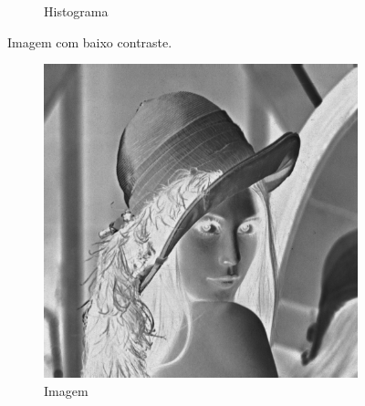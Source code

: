 \begin{figure}[!h]
\begin{subfigure}{\figw}
            \caption{\label{fig:lena_gray2:hist} Histograma}
        \end{subfigure}

    \caption{\label{fig:lena_gray2} Imagem com baixo contraste.}
\end{figure}

\begin{figure}[!h]
    \def\figw{0.45\textwidth}
    \centering
        \begin{subfigure}{\figw}
            \centering
            \includegraphics[scale=\scalei]{images/03/lena_neg.png}
            \caption{\label{fig:lena_neg:hist} Imagem}
        \end{subfigure}
        \begin{subfigure}{\figw}
            \centering

\end{subfigure}
\end{figure}
